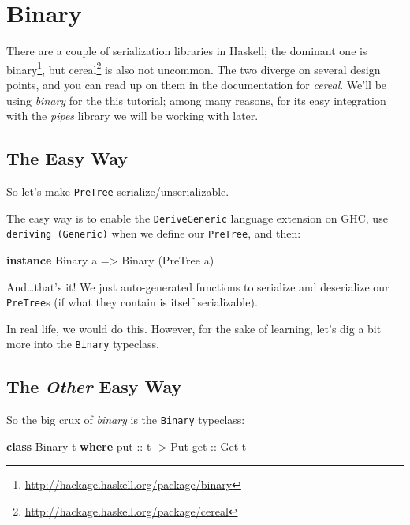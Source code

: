 \documentclass[]{article}
\newenvironment{Shaded}{}{}
\newcommand{\DataTypeTok}[1]{\textcolor[rgb]{0.56,0.13,0.00}{#1}}
\newcommand{\KeywordTok}[1]{\textcolor[rgb]{0.00,0.44,0.13}{\textbf{#1}}}
\newcommand{\NormalTok}[1]{#1}
\newcommand{\OtherTok}[1]{\textcolor[rgb]{0.00,0.44,0.13}{#1}}
\renewcommand{\href}[2]{#2\footnote{\url{#1}}}
\begin{document}
\section{Binary}\label{binary}

There are a couple of serialization libraries in Haskell; the dominant one is
\href{http://hackage.haskell.org/package/binary}{binary}, but
\href{http://hackage.haskell.org/package/cereal}{cereal} is also not uncommon.
The two diverge on several design points, and you can read up on them in the
documentation for \emph{cereal}. We'll be using \emph{binary} for the this
tutorial; among many reasons, for its easy integration with the \emph{pipes}
library we will be working with later.

\subsection{The Easy Way}\label{the-easy-way}

So let's make \texttt{PreTree} serialize/unserializable.

The easy way is to enable the \texttt{DeriveGeneric} language extension on GHC,
use \texttt{deriving\ (Generic)} when we define our \texttt{PreTree}, and then:

\begin{Shaded}
\begin{Highlighting}[]
\KeywordTok{instance} \DataTypeTok{Binary}\NormalTok{ a }\OtherTok{=\textgreater{}} \DataTypeTok{Binary}\NormalTok{ (}\DataTypeTok{PreTree}\NormalTok{ a)}
\end{Highlighting}
\end{Shaded}

And\ldots that's it! We just auto-generated functions to serialize and
deserialize our \texttt{PreTree}s (if what they contain is itself serializable).

In real life, we would do this. However, for the sake of learning, let's dig a
bit more into the \texttt{Binary} typeclass.

\subsection{\texorpdfstring{The \emph{Other} Easy
Way}{The Other Easy Way}}\label{the-other-easy-way}

So the big crux of \emph{binary} is the \texttt{Binary} typeclass:

\begin{Shaded}
\begin{Highlighting}[]
\KeywordTok{class} \DataTypeTok{Binary}\NormalTok{ t }\KeywordTok{where}
\OtherTok{    put ::}\NormalTok{ t }\OtherTok{{-}\textgreater{}} \DataTypeTok{Put}
\OtherTok{    get ::} \DataTypeTok{Get}\NormalTok{ t}
\end{Highlighting}
\end{Shaded}
\end{document}
